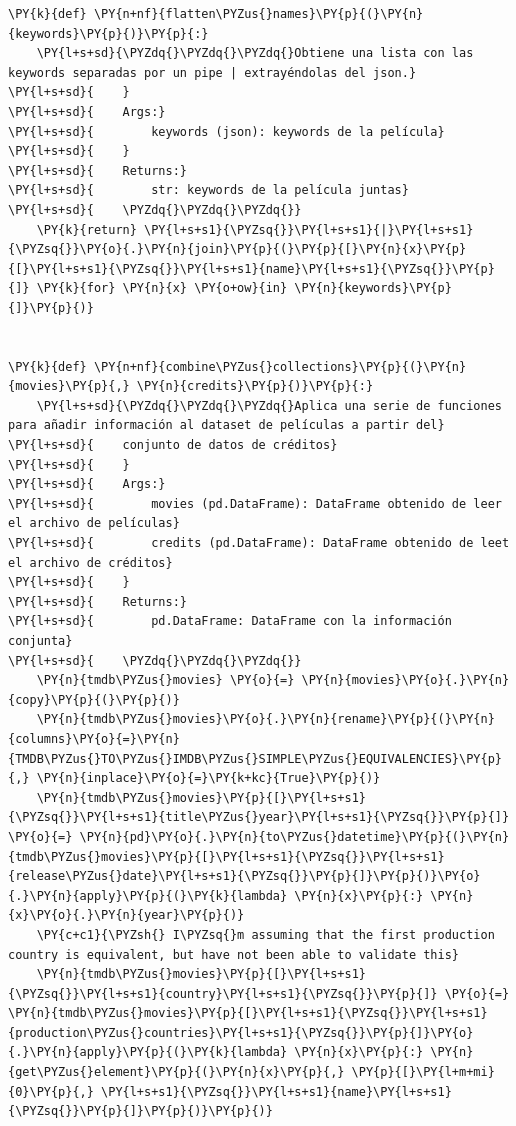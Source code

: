 \begin{tcolorbox}[breakable, size=fbox, boxrule=1pt, pad at break*=1mm,colback=cellbackground, colframe=cellborder]
\begin{Verbatim}[commandchars=\\\{\}]
\PY{k}{def} \PY{n+nf}{flatten\PYZus{}names}\PY{p}{(}\PY{n}{keywords}\PY{p}{)}\PY{p}{:}
    \PY{l+s+sd}{\PYZdq{}\PYZdq{}\PYZdq{}Obtiene una lista con las keywords separadas por un pipe | extrayéndolas del json.}
\PY{l+s+sd}{    }
\PY{l+s+sd}{    Args:}
\PY{l+s+sd}{        keywords (json): keywords de la película}
\PY{l+s+sd}{    }
\PY{l+s+sd}{    Returns:}
\PY{l+s+sd}{        str: keywords de la película juntas}
\PY{l+s+sd}{    \PYZdq{}\PYZdq{}\PYZdq{}}
    \PY{k}{return} \PY{l+s+s1}{\PYZsq{}}\PY{l+s+s1}{|}\PY{l+s+s1}{\PYZsq{}}\PY{o}{.}\PY{n}{join}\PY{p}{(}\PY{p}{[}\PY{n}{x}\PY{p}{[}\PY{l+s+s1}{\PYZsq{}}\PY{l+s+s1}{name}\PY{l+s+s1}{\PYZsq{}}\PY{p}{]} \PY{k}{for} \PY{n}{x} \PY{o+ow}{in} \PY{n}{keywords}\PY{p}{]}\PY{p}{)}


\PY{k}{def} \PY{n+nf}{combine\PYZus{}collections}\PY{p}{(}\PY{n}{movies}\PY{p}{,} \PY{n}{credits}\PY{p}{)}\PY{p}{:}
    \PY{l+s+sd}{\PYZdq{}\PYZdq{}\PYZdq{}Aplica una serie de funciones para añadir información al dataset de películas a partir del}
\PY{l+s+sd}{    conjunto de datos de créditos}
\PY{l+s+sd}{    }
\PY{l+s+sd}{    Args:}
\PY{l+s+sd}{        movies (pd.DataFrame): DataFrame obtenido de leer el archivo de películas}
\PY{l+s+sd}{        credits (pd.DataFrame): DataFrame obtenido de leet el archivo de créditos}
\PY{l+s+sd}{    }
\PY{l+s+sd}{    Returns:}
\PY{l+s+sd}{        pd.DataFrame: DataFrame con la información conjunta}
\PY{l+s+sd}{    \PYZdq{}\PYZdq{}\PYZdq{}}
    \PY{n}{tmdb\PYZus{}movies} \PY{o}{=} \PY{n}{movies}\PY{o}{.}\PY{n}{copy}\PY{p}{(}\PY{p}{)}
    \PY{n}{tmdb\PYZus{}movies}\PY{o}{.}\PY{n}{rename}\PY{p}{(}\PY{n}{columns}\PY{o}{=}\PY{n}{TMDB\PYZus{}TO\PYZus{}IMDB\PYZus{}SIMPLE\PYZus{}EQUIVALENCIES}\PY{p}{,} \PY{n}{inplace}\PY{o}{=}\PY{k+kc}{True}\PY{p}{)}
    \PY{n}{tmdb\PYZus{}movies}\PY{p}{[}\PY{l+s+s1}{\PYZsq{}}\PY{l+s+s1}{title\PYZus{}year}\PY{l+s+s1}{\PYZsq{}}\PY{p}{]} \PY{o}{=} \PY{n}{pd}\PY{o}{.}\PY{n}{to\PYZus{}datetime}\PY{p}{(}\PY{n}{tmdb\PYZus{}movies}\PY{p}{[}\PY{l+s+s1}{\PYZsq{}}\PY{l+s+s1}{release\PYZus{}date}\PY{l+s+s1}{\PYZsq{}}\PY{p}{]}\PY{p}{)}\PY{o}{.}\PY{n}{apply}\PY{p}{(}\PY{k}{lambda} \PY{n}{x}\PY{p}{:} \PY{n}{x}\PY{o}{.}\PY{n}{year}\PY{p}{)}
    \PY{c+c1}{\PYZsh{} I\PYZsq{}m assuming that the first production country is equivalent, but have not been able to validate this}
    \PY{n}{tmdb\PYZus{}movies}\PY{p}{[}\PY{l+s+s1}{\PYZsq{}}\PY{l+s+s1}{country}\PY{l+s+s1}{\PYZsq{}}\PY{p}{]} \PY{o}{=} \PY{n}{tmdb\PYZus{}movies}\PY{p}{[}\PY{l+s+s1}{\PYZsq{}}\PY{l+s+s1}{production\PYZus{}countries}\PY{l+s+s1}{\PYZsq{}}\PY{p}{]}\PY{o}{.}\PY{n}{apply}\PY{p}{(}\PY{k}{lambda} \PY{n}{x}\PY{p}{:} \PY{n}{get\PYZus{}element}\PY{p}{(}\PY{n}{x}\PY{p}{,} \PY{p}{[}\PY{l+m+mi}{0}\PY{p}{,} \PY{l+s+s1}{\PYZsq{}}\PY{l+s+s1}{name}\PY{l+s+s1}{\PYZsq{}}\PY{p}{]}\PY{p}{)}\PY{p}{)}

\end{Verbatim}
\end{tcolorbox}
